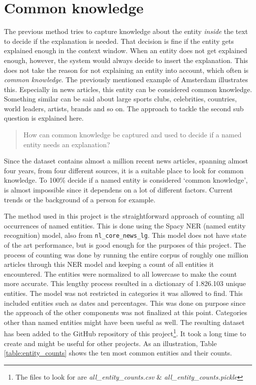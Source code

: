 \documentclass[
10pt, %
a4paper, %
oneside, %
headinclude,footinclude, %
] {book}%
\begin{document}
\section{Common knowledge}
The previous method tries to capture knowledge about the entity \textit{inside} the text to decide if the explanation is needed.
That decision is fine if the entity gets explained enough in the context window.
When an entity does not get explained enough, however, the system would always decide to insert the explanation.
This does not take the reason for not explaining an entity into account, which often is \textit{common knowledge}.
The previously mentioned example of Amsterdam illustrates this.
Especially in news articles, this entity can be considered common knowledge.
Something similar can be said about large sports clubs, celebrities, countries, world leaders, artists, brands and so on.
The approach to tackle the second sub question is explained here.
\begin{quote}
  How can common knowledge be captured and used to decide if a named entity needs an explanation?
\end{quote}

Since the dataset contains almost a million recent news articles, spanning almost four years, from four different sources, it is a suitable place to look for common knowledge.
To 100\% decide if a named entity is considered `common knowledge', is almost impossible since it dependens on a lot of different factors.
Current trends or the background of a person for example.

The method used in this project is the straightforward approach of counting all occurrences of named entities.
This is done using the Spacy NER (named entity recognition) model, also from \verb+nl_core_news_lg+.
This model does not have state of the art performance, but is good enough for the purposes of this project.
The process of counting was done by running the entire corpus of roughly one million articles through this NER model and keeping a count of all entities it encountered.
The entities were normalized to all lowercase to make the count more accurate.
This lengthy process resulted in a dictionary of 1.826.103 unique entities.
The model was not restricted in categories it was allowed to find.
This included entities such as dates and percentages.
This was done on purpose since the approach of the other components was not finalized at this point.
Categories other than named entities might have been useful as well.
The resulting dataset has been added to the GitHub repository of this project\footnote{The files to look for are \textit{all\_entity\_counts.csv} \& \textit{all\_entity\_counts.pickle}}.
It took a long time to create and might be useful for other projects.
As an illustration, Table \ref{table:entity_counts} shows the ten most common entities and their counts.
\end{document}
